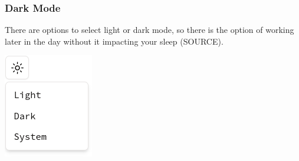 \subsubsection{Dark Mode}
\begin{minipage}{0.77\textwidth} 
There are options to select light or dark mode, so there is the option of working later in the day without it impacting your sleep (SOURCE). 
\end{minipage}
\hfill
\begin{minipage}{0.2\textwidth}
\includegraphics[width=\textwidth]{images/darkMode.png} 
\end{minipage}